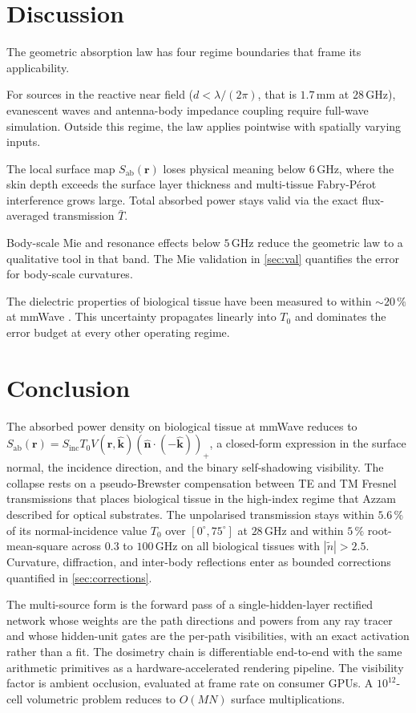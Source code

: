 \documentclass[journal,twocolumn,10pt]{IEEEtran}
\theoremstyle{plain}
\theoremstyle{remark}
\newcommand{\khat}{\hat{\bm{k}}}
\newcommand{\nhat}{\hat{\bm{n}}}
\newcommand{\rr}{\mathbf{r}}
\newcommand{\Sinc}{S_{\mathrm{inc}}}
\newcommand{\Sab}{S_{\mathrm{ab}}}
\newcommand{\Tbar}{\bar{T}}
\newcommand{\ntilde}{\tilde{n}}
\newcommand{\pospart}[1]{\left(#1\right)_{+}}
\newcommand{\Vis}{V}
\begin{document}
\section{Discussion}\label{sec:disc}

The geometric absorption law has four regime boundaries that frame
its applicability.

For sources in the reactive near field ($d < \lambda/(2\pi)$, that
is $1.7\,$mm at $28\,$GHz), evanescent waves and antenna-body
impedance coupling require full-wave simulation. Outside this
regime, the law applies pointwise with spatially varying
inputs.

The local surface map $\Sab(\rr)$ loses physical meaning below
$6\,$GHz, where the skin depth exceeds the surface layer thickness
and multi-tissue Fabry-P\'erot interference grows large.
Total absorbed power stays valid via the exact flux-averaged
transmission $\Tbar$.

Body-scale Mie and resonance effects below $5\,$GHz reduce the
geometric law to a qualitative tool in that band. The Mie validation
in \cref{sec:val} quantifies the error for body-scale curvatures.

The dielectric properties of biological tissue have been measured to
within $\sim 20\,\%$ at mmWave \cite{AlekseevZiskin2007}. This
uncertainty propagates linearly into $T_0$ and dominates the error
budget at every other operating regime.


\section{Conclusion}\label{sec:conc}

The absorbed power density on biological tissue at mmWave reduces to
$\Sab(\rr) = \Sinc T_0 \Vis(\rr,\khat) \pospart{\nhat \cdot (-\khat)}$,
a closed-form expression in the surface normal, the incidence
direction, and the binary self-shadowing visibility. The collapse
rests on a pseudo-Brewster compensation between TE and TM Fresnel
transmissions that places biological tissue in the high-index regime
that Azzam \cite{Azzam2015} described for optical substrates. The
unpolarised transmission stays within $5.6\,\%$ of its
normal-incidence value $T_0$ over $[0^\circ, 75^\circ]$ at $28\,$GHz
and within $5\,\%$ root-mean-square across $0.3$ to $100\,$GHz on all
biological tissues with $|\ntilde| > 2.5$. Curvature, diffraction,
and inter-body reflections enter as bounded corrections quantified in
\cref{sec:corrections}.

The multi-source form is the forward pass of a single-hidden-layer
rectified network whose weights are the path directions and powers
from any ray tracer and whose hidden-unit gates are the per-path
visibilities, with an exact activation rather than a fit. The
dosimetry chain is differentiable end-to-end with the same arithmetic
primitives as a hardware-accelerated rendering pipeline. The
visibility factor is ambient occlusion, evaluated at frame rate on
consumer GPUs. A
$10^{12}$-cell volumetric problem reduces to $O(MN)$ surface
multiplications.
\end{document}
